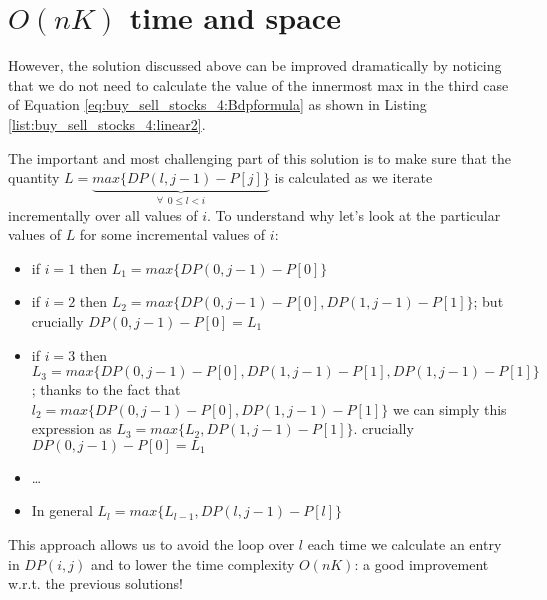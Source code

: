 

\section{$O(nK)$ time and space}
\label{buy_sell_stocks4:sec:linerartime1}
However, the solution discussed above can be improved dramatically by noticing that we do not need to calculate the value of the innermost max in the third case of Equation \ref{eq:buy_sell_stocks_4:Bdpformula} as shown in Listing \ref{list:buy_sell_stocks_4:linear2}.



The important and most challenging part of this solution is to make sure that the quantity $L=\underbrace{max\big\{DP(l,j-1)-P[j]\big\}}_{\forall \: \: 0 \leq l < i}$ is calculated as we iterate incrementally over all values of $i$. 
To understand why let's look at the particular values of $L$ for some incremental values of $i$:
\begin{itemize}
    \item if $i=1$ then $L_1=max\big\{DP(0,j-1)-P[0]\big\}$
    \item if $i=2$ then $L_2=max\big\{DP(0,j-1)-P[0],DP(1,j-1)-P[1]\big\}$; but crucially $DP(0,j-1)-P[0] = L_1$
    \item if $i=3$ then $L_3=max\big\{DP(0,j-1)-P[0],DP(1,j-1)-P[1],DP(1,j-1)-P[1]\big\}$; thanks to the fact that $l_2 = max \{DP(0,j-1)-P[0],DP(1,j-1)-P[1]\}$ we can simply this expression as  $L_3=max\big\{L_2,DP(1,j-1)-P[1]\big\}$.
     crucially $DP(0,j-1)-P[0] = L_1$
     \item \ldots
     \item In general $L_l = max\big\{L_{l-1}, DP(l,j-1)-P[l]\big\}$
\end{itemize}

This approach allows us to avoid the loop over $l$ each time we calculate an entry in $DP(i,j)$ and to lower the time complexity $O(nK)$: a good improvement w.r.t. the previous solutions!



